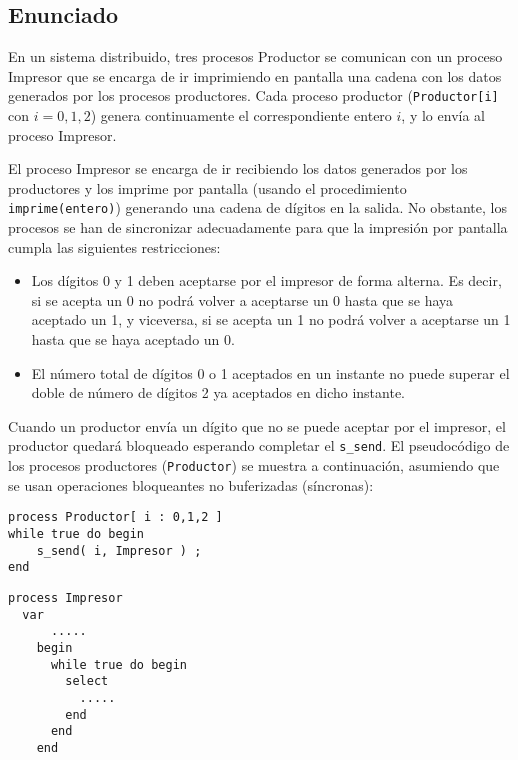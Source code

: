 \documentclass[a4paper,12pt]{article}
\begin{document}
\subsection{Enunciado}

En un sistema distribuido, tres procesos Productor se comunican con un proceso Impresor que se encarga de ir imprimiendo en pantalla una cadena con los datos generados por los procesos productores. Cada proceso productor (\texttt{Productor[i]} con \(i = 0, 1, 2\)) genera continuamente el correspondiente entero \(i\), y lo envía al proceso Impresor.

El proceso Impresor se encarga de ir recibiendo los datos generados por los productores y los imprime por pantalla (usando el procedimiento \texttt{imprime(entero)}) generando una cadena de dígitos en la salida. No obstante, los procesos se han de sincronizar adecuadamente para que la impresión por pantalla cumpla las siguientes restricciones:

\begin{itemize}
    \item Los dígitos 0 y 1 deben aceptarse por el impresor de forma alterna. Es decir, si se acepta un 0 no podrá volver a aceptarse un 0 hasta que se haya aceptado un 1, y viceversa, si se acepta un 1 no podrá volver a aceptarse un 1 hasta que se haya aceptado un 0.
    \item El número total de dígitos 0 o 1 aceptados en un instante no puede superar el doble de número de dígitos 2 ya aceptados en dicho instante.
\end{itemize}

Cuando un productor envía un dígito que no se puede aceptar por el impresor, el productor quedará bloqueado esperando completar el \texttt{s\_send}. El pseudocódigo de los procesos productores (\texttt{Productor}) se muestra a continuación, asumiendo que se usan operaciones bloqueantes no buferizadas (síncronas):

\begin{lstlisting}[style=customcpp]
process Productor[ i : 0,1,2 ]
while true do begin
    s_send( i, Impresor ) ;
end
\end{lstlisting}

\begin{lstlisting}[style=customcpp, caption={Pseudocódigo del proceso Impresor}]
process Impresor
  var
      .....
    begin
      while true do begin
        select
          .....
        end
      end
    end
\end{lstlisting}
\end{document}
